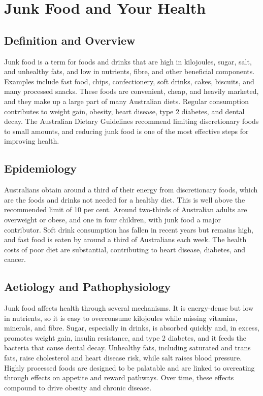 \chapter{Junk Food and Your Health}

\section*{Definition and Overview}
Junk food is a term for foods and drinks that are high in kilojoules, sugar, salt, and unhealthy fats, and low in nutrients, fibre, and other beneficial components. Examples include fast food, chips, confectionery, soft drinks, cakes, biscuits, and many processed snacks. These foods are convenient, cheap, and heavily marketed, and they make up a large part of many Australian diets. Regular consumption contributes to weight gain, obesity, heart disease, type 2 diabetes, and dental decay. The Australian Dietary Guidelines recommend limiting discretionary foods to small amounts, and reducing junk food is one of the most effective steps for improving health.

\section*{Epidemiology}
Australians obtain around a third of their energy from discretionary foods, which are the foods and drinks not needed for a healthy diet. This is well above the recommended limit of 10 per cent. Around two-thirds of Australian adults are overweight or obese, and one in four children, with junk food a major contributor. Soft drink consumption has fallen in recent years but remains high, and fast food is eaten by around a third of Australians each week. The health costs of poor diet are substantial, contributing to heart disease, diabetes, and cancer.

\section*{Aetiology and Pathophysiology}
Junk food affects health through several mechanisms. It is energy-dense but low in nutrients, so it is easy to overconsume kilojoules while missing vitamins, minerals, and fibre. Sugar, especially in drinks, is absorbed quickly and, in excess, promotes weight gain, insulin resistance, and type 2 diabetes, and it feeds the bacteria that cause dental decay. Unhealthy fats, including saturated and trans fats, raise cholesterol and heart disease risk, while salt raises blood pressure. Highly processed foods are designed to be palatable and are linked to overeating through effects on appetite and reward pathways. Over time, these effects compound to drive obesity and chronic disease.

